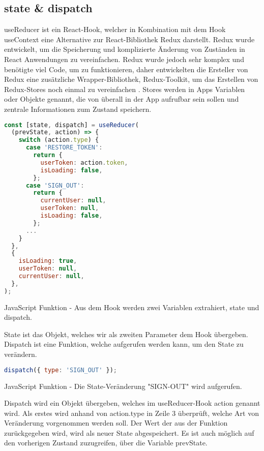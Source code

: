 \subsection{state \& dispatch}
useReducer ist ein React-Hook, welcher in Kombination mit dem Hook useContext eine Alternative zur
React-Bibliothek Redux darstellt. Redux wurde entwickelt, um die Speicherung und komplizierte
Änderung von Zuständen in React Anwendungen zu vereinfachen. Redux wurde jedoch sehr komplex und
benötigte viel Code, um zu funktionieren, daher entwickelten die Ersteller von Redux eine
zusätzliche Wrapper-Bibliothek, Redux-Toolkit, um das Erstellen von Redux-Stores noch einmal zu
vereinfachen \cite{reduxToolkit}. Stores werden in Apps Variablen oder Objekte genannt, die von
überall in der App aufrufbar sein sollen und zentrale Informationen zum Zustand speichern.

\begin{code}[htp]
\begin{lstlisting}[firstnumber=1,language=JavaScript, style=JSX]
const [state, dispatch] = useReducer(
  (prevState, action) => {
    switch (action.type) {
      case 'RESTORE_TOKEN':
        return {
          userToken: action.token,
          isLoading: false,
        };
      case 'SIGN_OUT':
        return {
          currentUser: null,
          userToken: null,
          isLoading: false,
        };
      ...
    }
  },
  {
    isLoading: true,
    userToken: null,
    currentUser: null,
  },
);
\end{lstlisting}
\caption{JavaScript Funktion - Aus dem Hook werden zwei Variablen extrahiert, state und dispatch.}
\end{code}

State ist das Objekt, welches wir als zweiten Parameter dem Hook übergeben. Dispatch ist eine
Funktion, welche aufgerufen werden kann, um den State zu verändern.

\newpage

\begin{code}[htp]
\begin{lstlisting}[firstnumber=1,language=JavaScript, style=JSX]
dispatch({ type: 'SIGN_OUT' });
\end{lstlisting}
\caption{JavaScript Funktion - Die State-Veränderung "SIGN-OUT" wird aufgerufen.}
\end{code}

Dispatch wird ein Objekt übergeben, welches im useReducer-Hook action genannt wird. Als erstes wird
anhand von action.type in Zeile 3 überprüft, welche Art von Veränderung vorgenommen werden soll.
Der Wert der aus der Funktion zurückgegeben wird, wird als neuer State abgespeichert. Es ist auch
möglich auf den vorherigen Zustand zuzugreifen, über die Variable prevState.
